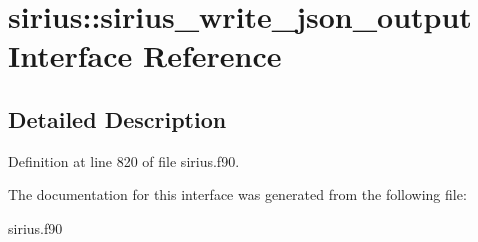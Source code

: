 \hypertarget{interfacesirius_1_1sirius__write__json__output}{}\section{sirius\+:\+:sirius\+\_\+write\+\_\+json\+\_\+output Interface Reference}
\label{interfacesirius_1_1sirius__write__json__output}


\subsection{Detailed Description}


Definition at line 820 of file sirius.\+f90.



The documentation for this interface was generated from the following file\+:\begin{DoxyCompactItemize}
\item 
sirius.\+f90\end{DoxyCompactItemize}
